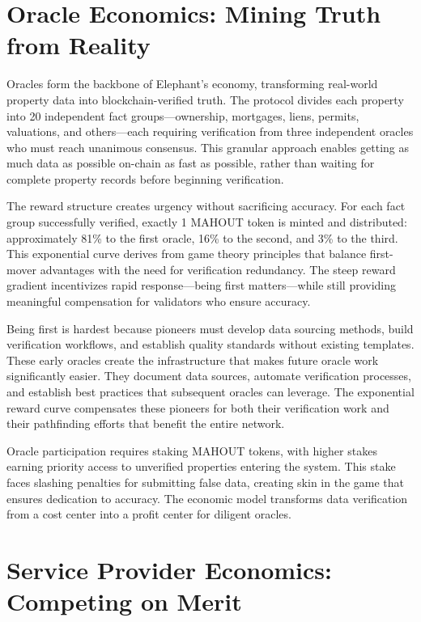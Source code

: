 \section{Oracle Economics: Mining Truth from Reality}

Oracles form the backbone of Elephant's economy, transforming real-world property data into blockchain-verified truth. The protocol divides each property into 20 independent fact groups—ownership, mortgages, liens, permits, valuations, and others—each requiring verification from three independent oracles who must reach unanimous consensus. This granular approach enables getting as much data as possible on-chain as fast as possible, rather than waiting for complete property records before beginning verification.

The reward structure creates urgency without sacrificing accuracy. For each fact group successfully verified, exactly 1 MAHOUT token is minted and distributed: approximately 81\% to the first oracle, 16\% to the second, and 3\% to the third. This exponential curve derives from game theory principles that balance first-mover advantages with the need for verification redundancy. The steep reward gradient incentivizes rapid response—being first matters—while still providing meaningful compensation for validators who ensure accuracy.

Being first is hardest because pioneers must develop data sourcing methods, build verification workflows, and establish quality standards without existing templates. These early oracles create the infrastructure that makes future oracle work significantly easier. They document data sources, automate verification processes, and establish best practices that subsequent oracles can leverage. The exponential reward curve compensates these pioneers for both their verification work and their pathfinding efforts that benefit the entire network.

Oracle participation requires staking MAHOUT tokens, with higher stakes earning priority access to unverified properties entering the system. This stake faces slashing penalties for submitting false data, creating skin in the game that ensures dedication to accuracy. The economic model transforms data verification from a cost center into a profit center for diligent oracles.

\section{Service Provider Economics: Competing on Merit}


